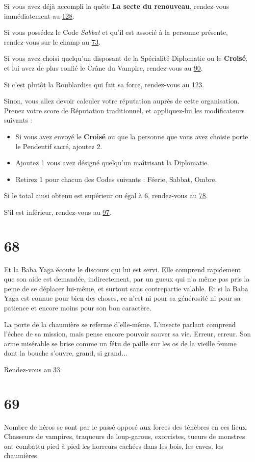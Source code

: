 \documentclass{report}
\newcommand{\gsection}[1]{
    \section{#1}
    \label{section-#1}
}
\newcommand{\glink}[1]{\hyperref[section-#1]{#1}}
\newcommand{\hero}[1]{\textbf{#1}}
\begin{document}
Si vous avez déjà accompli la quête \textbf{La secte du renouveau}, rendez-vous immédiatement au \glink{128}.

Si vous possédez le Code \emph{Sabbat} et qu'il est associé à la personne présente, rendez-vous sur le champ au \glink{73}.

Si vous avez choisi quelqu'un disposant de la Spécialité Diplomatie ou le \hero{Croisé}, et lui avez de plus confié le Crâne du Vampire, rendez-vous au \glink{90}.

Si c'est plutôt la Roublardise qui fait sa force, rendez-vous au \glink{123}.

Sinon, vous allez devoir calculer votre réputation auprès de cette organisation. Prenez votre score de Réputation traditionnel, et appliquez-lui les modificateurs suivants :

\begin{itemize}
\item Si vous avez envoyé le \hero{Croisé} ou que la personne que vous avez choisie porte le Pendentif sacré, ajoutez 2.
\item Ajoutez 1 vous avez désigné quelqu'un maîtrisant la Diplomatie.
\item Retirez 1 pour chacun des Codes suivants : Féerie, Sabbat, Ombre.
\end{itemize}

Si le total ainsi obtenu est supérieur ou égal à 6, rendez-vous au \glink{78}.

S'il est inférieur, rendez-vous au \glink{97}.

\gsection{68}

Et la Baba Yaga écoute le discours qui lui est servi. Elle comprend rapidement que son aide est demandée, indirectement, par un gueux qui n'a même pas pris la peine de se déplacer lui-même, et surtout sans contrepartie valable. Et si la Baba Yaga est connue pour bien des choses, ce n'est ni pour sa générosité ni pour sa patience et encore moins pour son bon caractère.

La porte de la chaumière se referme d'elle-même. L'insecte parlant comprend l'échec de sa mission, mais pense encore pouvoir sauver sa vie. Erreur, erreur. Son arme misérable se brise comme un fétu de paille sur les os de la vieille femme dont la bouche s'ouvre, grand, si grand...

Rendez-vous au \glink{33}.

\gsection{69}

Nombre de héros se sont par le passé opposé aux forces des ténèbres en ces lieux. Chasseurs de vampires, traqueurs de loup-garous, exorcistes, tueurs de monstres ont combattu pied à pied les horreurs cachées dans les bois, les caves, les chaumières.
\end{document}
